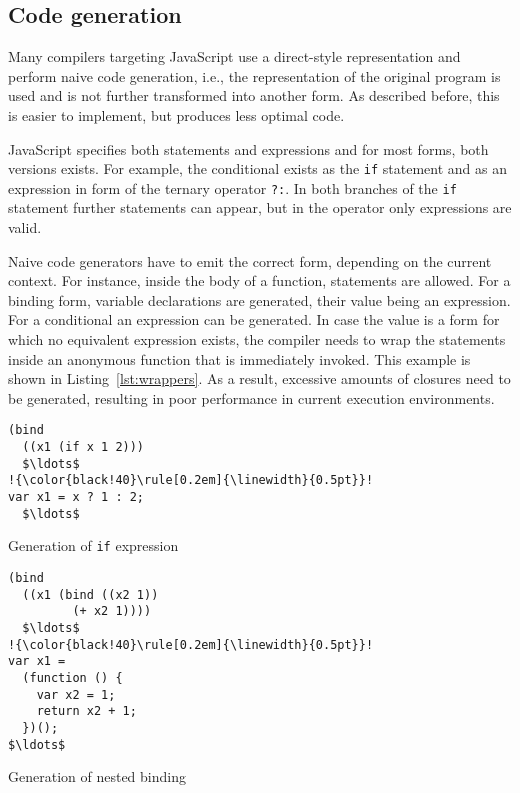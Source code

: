 \documentclass{acm_proc_article-sp}
\makeatletter
\newenvironment{sublisting}[2][]{%
\def\sf@one{#1}%
\def\sf@two{#2}%
\setbox\sf@box\hbox
\bgroup
}{%
\egroup
\ifx\@empty\sf@two\@empty\relax
\def\sf@two{\@empty}
\fi
\ifx\@empty\sf@one\@empty\relax
\subfloat[\sf@two]{\box\sf@box}%
\else
\subfloat[\sf@one][\sf@two]{\box\sf@box}%
\fi
}
\makeatother
\begin{document}
\subsection{Code generation}

Many compilers targeting JavaScript use a direct-style representation
and perform naive code generation, i.e., the representation of the
original program is used and is not further transformed into another
form. As described before, this is easier to implement, but produces
less optimal code.

JavaScript specifies both statements and expressions and for most
forms, both versions exists. For example, the conditional exists as
the \texttt{if} statement and as an expression in form of the ternary
operator \texttt{?:}. In both branches of the \texttt{if} statement
further statements can appear, but in the operator only expressions
are valid.


Naive code generators have to emit the correct form, depending on the
current context. For instance, inside the body of a function,
statements are allowed. For a binding form, variable declarations are
generated, their value being an expression. For a conditional an
expression can be generated. In case the value is a form for which no
equivalent expression exists, the compiler needs to wrap the
statements inside an anonymous function that is immediately
invoked. This example is shown in Listing~\ref{lst:wrappers}. As a
result, excessive amounts of closures need to be generated,
resulting in poor performance in current execution environments.

\begin{mylisting}[h]
  \caption{Naive code generation}
  \label{lst:wrappers}
  \vspace{-2em}
  \begin{sublisting}{Generation of \texttt{if} expression}
    \begin{minipage}[b]{.44\textwidth}
      \begin{lstlisting}[escapechar=!]
(bind
  ((x1 (if x 1 2)))
  $\ldots$
!{\color{black!40}\rule[0.2em]{\linewidth}{0.5pt}}!
var x1 = x ? 1 : 2;
  $\ldots$
      \end{lstlisting}
    \end{minipage}
  \end{sublisting}
  \hfill
  \begin{sublisting}{Generation of nested binding}
    \begin{minipage}[b]{.45\textwidth}
      \begin{lstlisting}[escapechar=!]
(bind
  ((x1 (bind ((x2 1))
         (+ x2 1))))
  $\ldots$
!{\color{black!40}\rule[0.2em]{\linewidth}{0.5pt}}!
var x1 =
  (function () {
    var x2 = 1;
    return x2 + 1;
  })();
$\ldots$
      \end{lstlisting}
    \end{minipage}
  \end{sublisting}
\end{mylisting}
\vspace{-0.5em}
\end{document}
